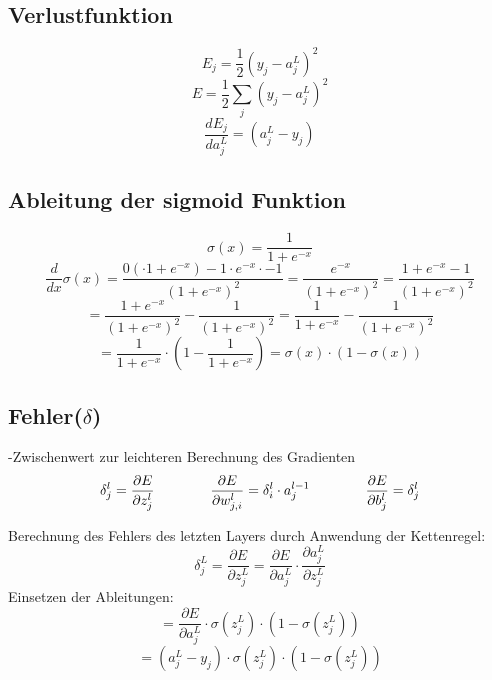 \documentclass{article}
\begin{document}
\subsection{Verlustfunktion}
\[ E_j = \frac{1}{2}(y_j - a_j^L)^2 \]
\[ E = \frac{1}{2}\sum_{j}^{} (y_j - a_j^L)^2 \]
\[ \frac{dE_j}{da_{j}^L}  = (a_j^L - y_j) \]


\subsection{Ableitung der sigmoid Funktion}
\[\sigma(x) = \frac{1}{1 + e^{-x}}\]
\[ \frac{d}{dx}\sigma(x) = \frac{
0( \cdot 1 + e^{-x}) - 1 \cdot e^{-x} \cdot -1
}{
    (1 + e^{-x})^2
} = \frac{e^{-x}}{(1 + e^{-x})^2}
= \frac{1 + e^{-x} - 1}{(1 + e^{-x})^2} \]
\[ =\frac{1 + e^{-x}}{(1 + e^{-x})^2} - \frac{1}{(1 + e^{-x})^2} 
= \frac{1}{1 + e^{-x}} - \frac{1}{(1 + e^{-x})^2} \]
\[ = \frac{1}{1 + e^{-x}} \cdot (1 - \frac{1}{1 + e^{-x}}) 
= \sigma(x) \cdot (1 - \sigma(x)) \]



\subsection{Fehler($\delta$)}
-Zwischenwert zur leichteren Berechnung des Gradienten
\[ \delta_j^l = \frac{\partial E}{\partial z_j^l} 
\kern 40pt
 \frac{\partial E}{\partial w_{j,i}^l} = \delta_i^l \cdot a_j^{l-1}
\kern 40pt
\frac{\partial E}{\partial b_j^l} = \delta_j^l \]

Berechnung des Fehlers des letzten Layers durch Anwendung der Kettenregel:
\[ \delta_j^L  = \frac{\partial E}{\partial z_j^L}
= \frac{\partial E}{\partial a_j^L} \cdot \frac{\partial a_j^L}{\partial z_j^L}\]
Einsetzen der Ableitungen:
\[ = \frac{\partial E}{\partial a_j^L} \cdot \sigma (z_j^L) \cdot (1 - \sigma (z_j^L)) \]
\[ = (a_j^L - y_j) \cdot \sigma (z_j^L) \cdot (1 - \sigma (z_j^L)) \]
\end{document}
